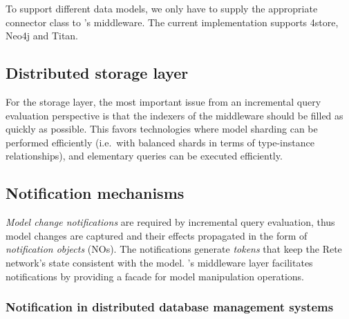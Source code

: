 To support different data models, we only have to supply the appropriate connector class to \iqd{}'s middleware. The current implementation supports 4store, Neo4j and Titan. %

\subsection{Distributed storage layer}

For the storage layer, the most important issue from an incremental query evaluation perspective is that the indexers of the middleware should be filled as quickly as possible. This favors technologies where model sharding can be performed efficiently (i.e.\ with balanced shards in terms of type-instance relationships), and elementary queries 
can be executed efficiently.

\subsection{Notification mechanisms}


\emph{Model change notifications} are required by incremental query evaluation, thus model changes are captured and their effects propagated in the form of \emph{notification objects} (NOs). The notifications generate \emph{tokens} that keep the Rete network's state consistent with the model. \iqd{}'s middleware layer facilitates notifications by providing a facade for model manipulation operations.


\subsubsection{Notification in distributed database management systems}

